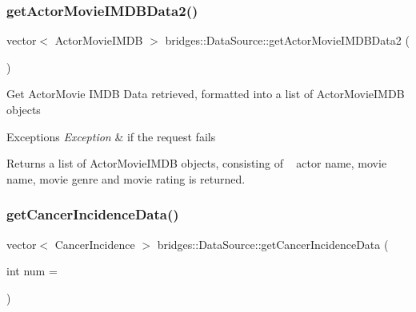 \subsubsection{\texorpdfstring{get\+Actor\+Movie\+I\+M\+D\+B\+Data2()}{getActorMovieIMDBData2()}}
{\footnotesize\ttfamily vector$<$ Actor\+Movie\+I\+M\+DB $>$ bridges\+::\+Data\+Source\+::get\+Actor\+Movie\+I\+M\+D\+B\+Data2 (\begin{DoxyParamCaption}{ }\end{DoxyParamCaption})}

Get Actor\+Movie I\+M\+DB Data retrieved, formatted into a list of Actor\+Movie\+I\+M\+DB objects


\begin{DoxyExceptions}{Exceptions}
{\em Exception} & if the request fails\\
\hline
\end{DoxyExceptions}
\begin{DoxyReturn}{Returns}
a list of Actor\+Movie\+I\+M\+DB objects, consisting of ~\newline
actor name, movie name, movie genre and movie rating is returned. 
\end{DoxyReturn}
\mbox{\label{namespacebridges_1_1_data_source_a4f8990ea0e793a6464d95cb82f57c8f9}} 
\subsubsection{\texorpdfstring{get\+Cancer\+Incidence\+Data()}{getCancerIncidenceData()}}
{\footnotesize\ttfamily vector$<$ Cancer\+Incidence $>$ bridges\+::\+Data\+Source\+::get\+Cancer\+Incidence\+Data (\begin{DoxyParamCaption}\item[{int}]{num = {} }\end{DoxyParamCaption})}

\mbox{\label{namespacebridges_1_1_data_source_ae9f6a40dae8b8a15ebe43aca34931b43}} 
